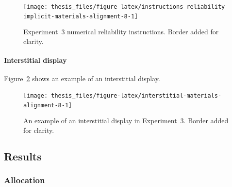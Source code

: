 \documentclass[a4paper, nobind, dvipsnames]{templates/ociamthesis}
\theoremstyle{definition}
\theoremstyle{definition}
\theoremstyle{definition}
\theoremstyle{definition}
\theoremstyle{remark}
\begin{document}
\begin{figure}
\texttt{[image: thesis\_files/figure-latex/instructions-reliability-implicit-materials-alignment-8-1]} \caption{Experiment~3 numerical reliability instructions. Border added for clarity.}\label{fig:instructions-reliability-implicit-materials-alignment-8}
\end{figure}

\hypertarget{interstitial-materials-alignment-8}{%
\paragraph{Interstitial display}\label{interstitial-materials-alignment-8}}

Figure~\ref{fig:interstitial-materials-alignment-8} shows an example of an
interstitial display.



\begin{figure}
\texttt{[image: thesis\_files/figure-latex/interstitial-materials-alignment-8-1]} \caption{An example of an interstitial display in Experiment~3. Border added for clarity.}\label{fig:interstitial-materials-alignment-8}
\end{figure}

\subsection{Results}

\hypertarget{results-alignment-8-allocation}{%
\subsubsection{Allocation}\label{results-alignment-8-allocation}}
\end{document}
